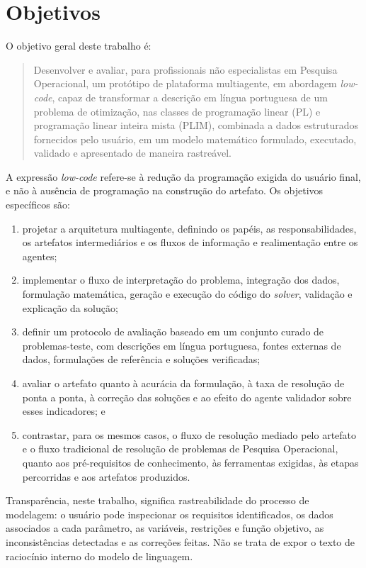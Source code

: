 \section{Objetivos}
\label{sec:objetivos}

O objetivo geral deste trabalho é:

\begin{quote}
  Desenvolver e avaliar, para profissionais não especialistas em Pesquisa Operacional, um protótipo de plataforma multiagente, em abordagem \textit{low-code}, capaz de transformar a descrição em língua portuguesa de um problema de otimização, nas classes de programação linear (PL) e programação linear inteira mista (PLIM), combinada a dados estruturados fornecidos pelo usuário, em um modelo matemático formulado, executado, validado e apresentado de maneira rastreável.
\end{quote}

A expressão \textit{low-code} refere-se à redução da programação exigida do usuário final, e não à ausência de programação na construção do artefato. Os objetivos específicos são:

\begin{enumerate}
  \item projetar a arquitetura multiagente, definindo os papéis, as responsabilidades, os artefatos intermediários e os fluxos de informação e realimentação entre os agentes;
  \item implementar o fluxo de interpretação do problema, integração dos dados, formulação matemática, geração e execução do código do \textit{solver}, validação e explicação da solução;
  \item definir um protocolo de avaliação baseado em um conjunto curado de problemas-teste, com descrições em língua portuguesa, fontes externas de dados, formulações de referência e soluções verificadas;
  \item avaliar o artefato quanto à acurácia da formulação, à taxa de resolução de ponta a ponta, à correção das soluções e ao efeito do agente validador sobre esses indicadores; e
  \item contrastar, para os mesmos casos, o fluxo de resolução mediado pelo artefato e o fluxo tradicional de resolução de problemas de Pesquisa Operacional, quanto aos pré-requisitos de conhecimento, às ferramentas exigidas, às etapas percorridas e aos artefatos produzidos.
\end{enumerate}

Transparência, neste trabalho, significa rastreabilidade do processo de modelagem: o usuário pode inspecionar os requisitos identificados, os dados associados a cada parâmetro, as variáveis, restrições e função objetivo, as inconsistências detectadas e as correções feitas. Não se trata de expor o texto de raciocínio interno do modelo de linguagem.

